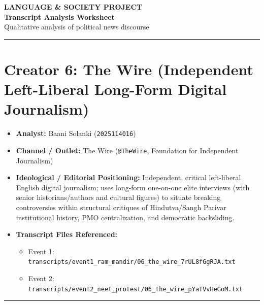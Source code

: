 \documentclass[10pt,a4paper]{article}
\begin{document}
\clearpage

\begin{center}
    {\large\bfseries LANGUAGE \& SOCIETY PROJECT}\\[3pt]
    {\LARGE\bfseries Transcript Analysis Worksheet}\\[3pt]
    {\normalsize Qualitative analysis of political news discourse}
\end{center}
\vspace{2pt}
\noindent\rule{\textwidth}{0.4pt}
\vspace{4pt}


\section*{Creator 6: The Wire (Independent Left-Liberal Long-Form Digital Journalism)}
\begin{itemize}[leftmargin=1.5em, itemsep=3pt, topsep=4pt]
  \item \textbf{Analyst:} Baani Solanki (\texttt{2025114016})
  \item \textbf{Channel / Outlet:} The Wire (\texttt{@TheWire}, Foundation for Independent Journalism)
  \item \textbf{Ideological / Editorial Positioning:} Independent, critical left-liberal English digital journalism; uses long-form one-on-one elite interviews (with senior historians/authors and cultural figures) to situate breaking controversies within structural critiques of Hindutva/Sangh Parivar institutional history, PMO centralization, and democratic backsliding.
  \item \textbf{Transcript Files Referenced:}
  \begin{itemize}[leftmargin=1.4em, itemsep=2pt, topsep=2pt]
    \item Event 1: \texttt{transcripts/event1\_ram\_mandir/06\_the\_wire\_7rUL8fGgRJA.txt}
    \item Event 2: \texttt{transcripts/event2\_neet\_protest/06\_the\_wire\_pYaTVvHeGoM.txt}
  \end{itemize}
\end{itemize}
\vspace{4pt}\noindent\rule{\textwidth}{0.4pt}\vspace{4pt}
\end{document}
